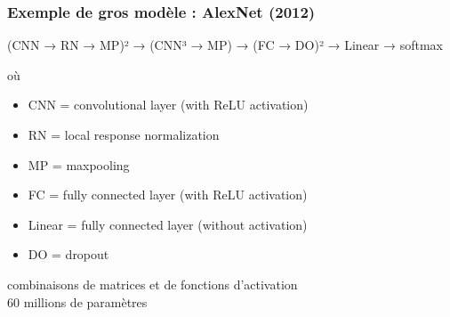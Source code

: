 


  

\begin{frame}
  \frametitle{Exemple de gros modèle : AlexNet (2012)}

    (CNN → RN → MP)² → (CNN³ → MP) → (FC → DO)² → Linear → softmax

où

\begin{itemize}
\item     CNN = convolutional layer (with ReLU activation)
\item     RN = local response normalization
\item     MP = maxpooling
\item     FC = fully connected layer (with ReLU activation)
\item     Linear = fully connected layer (without activation)
\item     DO = dropout
\end{itemize}

combinaisons de matrices et de fonctions d'activation \\
60 millions de paramètres 

\end{frame}
